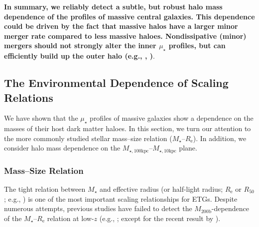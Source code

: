 \documentclass[a4paper,fleqn,usenatbib]{mnras}
\def\mstar{{$M_{\star}$}}
\def\mhalo{{$M_{\mathrm{200b}}$}}
\def\minn{{$M_{\star,10\mathrm{kpc}}$}}
\def\mtot{{$M_{\star,100\mathrm{kpc}}$}}
\def\mden{{$\mu_{\star}$}}
\begin{document}
    \textbf{In summary, we reliably detect a subtle, but robust halo mass dependence of 
    the profiles of massive central galaxies. 
    This dependence could be driven by the fact that massive halos have a larger minor 
    merger rate compared to less massive haloes. 
    Nondissipative (minor) mergers should not strongly alter the inner \mden{} 
    profiles, but can efficiently build up the outer halo 
    (e.g., \citealt{Hilz2013}, \citealt{Oogi2013})}.
      

\subsection{The Environmental Dependence of Scaling Relations}
    \label{ssec:scaling}
    
    We have shown that the \mden{} profiles of massive galaxies 
    show a dependence on the masses of their host dark matter haloes. 
    In this section, we turn our attention to the more commonly studied stellar 
    mass--size relation (\mstar{}--$R_{\mathrm{e}}$). 
    In addition, we consider halo mass dependence on the 
    \mtot{}--\minn{} plane. 
    
\subsubsection{Mass--Size Relation}
    \label{sssec:mass_size}
    
    The tight relation between \mstar{} and effective radius (or half-light radius; 
    $R_{\mathrm{e}}$ or $R_{\mathrm{50}}$; e.g., \citealt{Shankar2013, Leja2013, 
    vdWel2014}) is one of the most important scaling relationships for ETGs. 
    Despite numerous attempts, previous studies have failed to detect the 
    \mhalo{}-dependence of the \mstar{}--$R_{\mathrm{e}}$ relation at low-$z$ 
    (e.g., \citealt{Weinmann2009, Nair2010, HCompany13, Cerbrian2014}; 
    except for the recent result by \citealt{Yoon2017}). 
    
\end{document}
